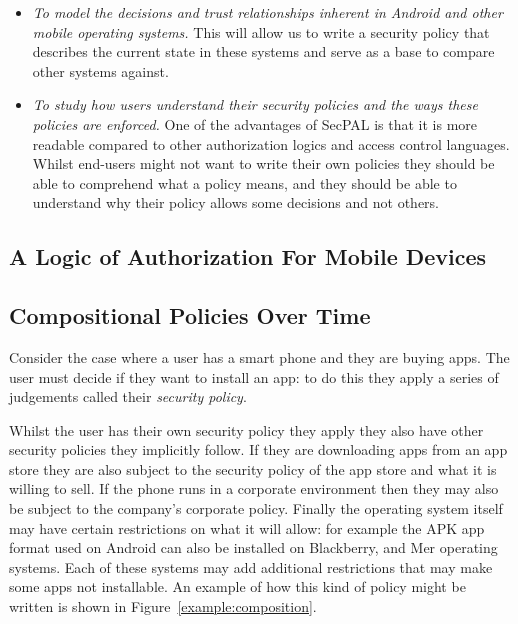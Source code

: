 \documentclass[report.tex]{subfiles}
\begin{document}
\begin{itemize}
  \item \emph{To model the decisions and trust relationships inherent in Android
      and other mobile operating systems.}  This will allow us to write a
    security policy that describes the current state in these systems and serve
    as a base to compare other systems against. 

  \item \emph{To study how users understand their security policies and the
      ways these policies are enforced.}  One of the advantages of SecPAL is
    that it is more readable compared to other authorization logics and access
    control languages.  Whilst end-users might not want to write their own
    policies they should be able to comprehend what a policy means, and they
    should be able to understand why their policy allows some decisions and not
    others.

\end{itemize}

\subsection{A Logic of Authorization For Mobile Devices}


\subsection{Compositional Policies Over Time}

Consider the case where a user has a smart phone and they are buying apps.  The
user must decide if they want to install an app: to do this they apply a series
of judgements called their \emph{security policy}.  

Whilst the user has their own security policy they apply they also have other
security policies they implicitly follow.  If they are downloading apps from an
app store they are also subject to the security policy of the app store and what
it is willing to sell.  If the phone runs in a corporate environment then they
may also be subject to the company's corporate policy.  Finally the operating
system itself may have certain restrictions on what it will allow: for example
the APK app format used on Android can also be installed on Blackberry, and Mer
operating systems.  Each of these systems may add additional restrictions that
may make some apps not installable.  An example of how this kind of policy might
be written is shown in Figure~\ref{example:composition}.
\end{document}
